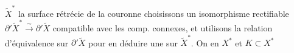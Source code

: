 $\widetilde X^*$ la surface  rétrécie
 de la couronne
choisissons un isomorphisme rectifiable
$\partial'\widetilde X^*\xrightarrow{\sim}\partial'\widetilde X$ compatible avec les comp. connexes,
et utilisons la relation d'équivalence  sur
$\partial'\widetilde X$ pour en déduire une sur $\widetilde X^*$. On
en   $X^*$ et $K\subset X^*$
